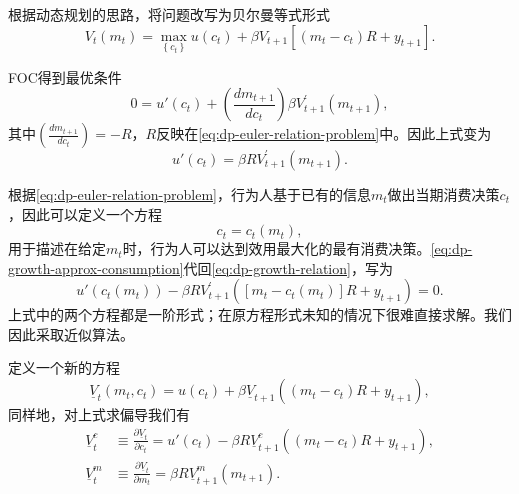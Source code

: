 根据动态规划的思路，将问题改写为贝尔曼等式形式
\begin{equation}
  \label{eq:dp-growth-bellman}
  V_{t} \left( m_{t} \right)
  = \max_{\left\{ c_{t} \right\} }
  u \left( c_{t} \right)
  + \beta V_{t+1} \left[ \left( m_{t} - c_{t}  \right) R + y_{t+1} \right].
\end{equation}

FOC得到最优条件
\begin{equation*}
  0 = u' \left( c_{t} \right) +
  \left( \frac{d m_{t+1}}{d c_{t}} \right)
  \beta V_{t+1}^{'} \left( m_{t+1} \right),
\end{equation*}
其中$\left( \frac{d m_{t+1}}{d c_{t}} \right) = - R$，$R$反映在\eqref{eq:dp-euler-relation-problem}中。因此上式变为
\begin{equation}
  \label{eq:dp-growth-relation}
  u' \left( c_{t} \right) = \beta R  V_{t+1}^{'} \left( m_{t+1} \right).
\end{equation}

根据\eqref{eq:dp-euler-relation-problem}，行为人基于已有的信息$m_{t}$做出当期消费决策$c_{t}$，因此可以定义一个方程
\begin{equation}
  \label{eq:dp-growth-approx-consumption}
  c_{t} = c_{t} \left( m_{t} \right),
\end{equation}
用于描述在给定$m_{t}$时，行为人可以达到效用最大化的最有消费决策。\eqref{eq:dp-growth-approx-consumption}代回\eqref{eq:dp-growth-relation}，写为
\begin{equation}
  \label{eq:dp-growth-approx-consumption-approx}
  u' \left( c_{t} \left( m_{t} \right) \right)
  - \beta R V_{t+1}^{'} \left(
  \left[ m_{t} - c_{t} \left( m_{t} \right) \right] R + y_{t+1}
  \right)=0.
\end{equation}
上式中的两个方程都是一阶形式；在原方程形式未知的情况下很难直接求解。我们因此采取近似算法。

定义一个新的方程
\begin{equation}
  \label{eq:dp-growth-value-approx}
  \underline{V}_{t} \left( m_{t}, c_{t} \right)
  = u(c_{t}) + \beta \underline{V}_{t+1}
  \left(
  \left(m_{t} - c_{t} \right) R + y_{t+1}
  \right),
\end{equation}
同样地，对上式求偏导我们有
\begin{align}
  \label{eq:dp-growth-value-approx-foc-c}
  \underline{V}_{t}^{c} & \equiv \frac{\partial \underline{V}_{t}}{\partial c_{t}}
  = u'(c_{t}) - \beta R \underline{V}_{t+1}^{c}
  \left(
  \left(m_{t} - c_{t} \right) R + y_{t+1}
  \right), \\
  \label{eq:dp-growth-value-approx-foc-m}
  \underline{V}_{t}^{m} & \equiv \frac{\partial \underline{V}_{t}}{\partial m_{t}}
  = \beta R \underline{V}_{t+1}^{m} \left( m_{t+1} \right).
\end{align}

